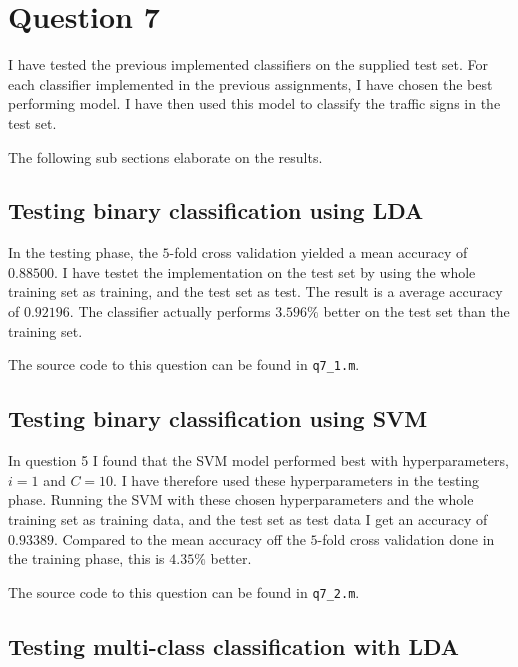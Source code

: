 \documentclass[10pt]{article}
\begin{document}


\section*{Question 7} %
\label{sec:question_7}
I have tested the previous implemented classifiers on the supplied test set. For each classifier implemented in the previous assignments, I have chosen the best performing model. I have then used this model to classify the traffic signs in the test set.

The following sub sections elaborate on the results.

\subsection*{Testing binary classification using LDA} %
\label{sub:binary_classification}
In the testing phase, the $5$-fold cross validation yielded a mean accuracy of $0.88500$. I have testet the implementation on the test set by using the whole training set as training, and the test set as test. The result is a average accuracy of $0.92196$. The classifier actually performs $3.596\%$ better on the test set than the training set. 

The source code to this question can be found in \texttt{q7\_1.m}.


\subsection*{Testing binary classification using SVM} %
\label{ssub:testing_binary_classification_using_svm}
In question 5 I found that the SVM model performed best with hyperparameters, $i=1$ and $C=10$. I have therefore used these hyperparameters in the testing phase. Running the SVM with these chosen hyperparameters and the whole training set as training data, and the test set as test data I get an accuracy of $0.93389$. Compared to the mean accuracy off the $5$-fold cross validation done in the training phase, this is $4.35\%$ better.

The source code to this question can be found in \texttt{q7\_2.m}.

\subsection*{Testing multi-class classification with LDA} %
\label{sub:multi_class_classification}
\end{document}

